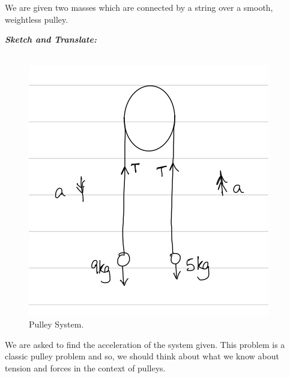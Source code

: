 %
%
%


\begin{subquestions}
	
\subquestion

We are given two masses which are connected by a string over a smooth, weightless pulley.

\begin{subsubquestions}
	
\subsubquestion

\textbf{\textit{Sketch and Translate:}} \\ \\
\begin{figure}[H]
	\begin{center}
		\includegraphics[scale=0.25]{../2013/figures/2013q6-1}
		\caption{\label{2013:q6:Sketch1} Pulley System.}
	\end{center}
\end{figure}	
We are asked to find the acceleration of the system given. This problem is a classic pulley problem and so, we should think about what we know about tension and forces in the context of pulleys.





\end{subsubquestions}
\end{subquestions}
